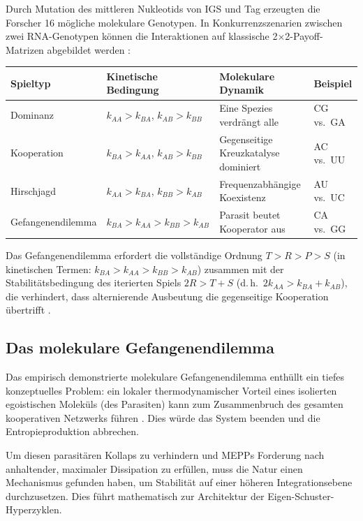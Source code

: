 \documentclass[12pt,a4paper]{article}
\theoremstyle{remark}
\begin{document}
Durch Mutation des mittleren Nukleotids von IGS und Tag erzeugten die Forscher 16 m\"ogliche molekulare Genotypen. In Konkurrenzszenarien zwischen zwei RNA-Genotypen k\"onnen die Interaktionen auf klassische 2$\times$2-Payoff-Matrizen abgebildet werden \citep{AzoarcusPMC}:

\begin{center}
\begin{tabular}{llll}
\toprule
\textbf{Spieltyp} & \textbf{Kinetische Bedingung} & \textbf{Molekulare Dynamik} & \textbf{Beispiel} \\
\midrule
Dominanz & $k_{AA} > k_{BA}$, $k_{AB} > k_{BB}$ & Eine Spezies verdrängt alle & CG vs.\ GA \\
Kooperation & $k_{BA} > k_{AA}$, $k_{AB} > k_{BB}$ & Gegenseitige Kreuzkatalyse dominiert & AC vs.\ UU \\
Hirschjagd & $k_{AA} > k_{BA}$, $k_{BB} > k_{AB}$ & Frequenzabhängige Koexistenz & AU vs.\ UC \\
Gefangenendilemma & $k_{BA} > k_{AA} > k_{BB} > k_{AB}$ & Parasit beutet Kooperator aus & CA vs.\ GG \\
\bottomrule
\end{tabular}
\end{center}

\noindent
Das Gefangenendilemma erfordert die vollst\"andige Ordnung $T > R > P > S$ (in kinetischen Termen: $k_{BA} > k_{AA} > k_{BB} > k_{AB}$) zusammen mit der Stabilit\"atsbedingung des iterierten Spiels $2R > T + S$ (d.\,h.\ $2k_{AA} > k_{BA} + k_{AB}$), die verhindert, dass alternierende Ausbeutung die gegenseitige Kooperation \"ubertrifft \citep{HofbauerSigmund1998}.

\subsection{Das molekulare Gefangenendilemma}

Das empirisch demonstrierte molekulare Gefangenendilemma enth\"ullt ein tiefes konzeptuelles Problem: ein lokaler thermodynamischer Vorteil eines isolierten egoistischen Molek\"uls (des Parasiten) kann zum Zusammenbruch des gesamten kooperativen Netzwerks f\"uhren \citep{AzoarcusPMC}. Dies w\"urde das System beenden und die Entropieproduktion abbrechen.

Um diesen parasit\"aren Kollaps zu verhindern und MEPPs Forderung nach anhaltender, maximaler Dissipation zu erf\"ullen, muss die Natur einen Mechanismus gefunden haben, um Stabilit\"at auf einer h\"oheren Integrationsebene durchzusetzen. Dies f\"uhrt mathematisch zur Architektur der Eigen-Schuster-Hyperzyklen.
\end{document}
